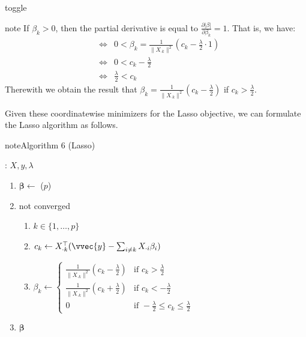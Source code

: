 \documentclass[letterpaper,10pt,english]{jupyterBook}
\begin{document}
\begin{sphinxuseclass}{toggle}
\begin{sphinxadmonition}{note}
\sphinxAtStartPar
{}If \(\beta_k>0\), then the partial derivative is equal to \(\frac{\partial\lvert\beta\rvert}{\partial \beta_k}=1\). That is, we have:
\label{equation:regression_lasso:f69e75a6-08ed-4f46-b11e-63f328d40013}\begin{align}
&\Leftrightarrow& 0<\beta_k = \frac{1}{\lVert X_{\cdot k}\rVert^2}\left(c_k - \frac \lambda 2\cdot 1\right)\\
&\Leftrightarrow& 0<c_k - \frac \lambda 2\\
&\Leftrightarrow& \frac \lambda 2 < c_k 
\end{align}
\sphinxAtStartPar
Therewith we obtain the result that \(\beta_k = \frac{1}{\lVert X_{\cdot k}\rVert^2}\left(c_k - \frac \lambda 2\right)\) if \(c_k>\frac \lambda 2\).
\end{sphinxadmonition}

\end{sphinxuseclass}
\sphinxAtStartPar
Given these coordinate\sphinxhyphen{}wise minimizers for the Lasso objective, we can formulate the Lasso algorithm as follows.
\label{regression_lasso:algorithm-1}
\begin{sphinxadmonition}{note}{Algorithm 6 (Lasso)}



\sphinxAtStartPar
{}: \(X,y,\lambda\)
\begin{enumerate}
%
\item {} 
\sphinxAtStartPar
\(\bm\beta\gets\) (\(p\))

\item {} 
\sphinxAtStartPar
{} not converged
\begin{enumerate}
%
\item {} 
\sphinxAtStartPar
{} \(k\in\{1,\ldots, p\}\)

\item {} 
\sphinxAtStartPar
\(c_k\gets X_{\cdot k}^\top (\vvec{y}- \sum_{i\neq k} X_{\cdot i}\beta_i)\)

\item {} 
\sphinxAtStartPar
\(\beta_k\gets \begin{cases}
 \frac{1}{\lVert X_{\cdot k}\rVert^2}(c_k -\frac\lambda 2) & \text{if } c_k>\frac \lambda 2\\
 \frac{1}{\lVert X_{\cdot k}\rVert^2}(c_k +\frac\lambda 2) & \text{if } c_k<-\frac \lambda 2\\
 0 & \text{if } -\frac\lambda 2\leq c_k\leq \frac\lambda 2\end{cases}\)

\end{enumerate}

\item {} 
\sphinxAtStartPar
{} \(\bm\beta\)

\end{enumerate}
\end{sphinxadmonition}
\end{document}
